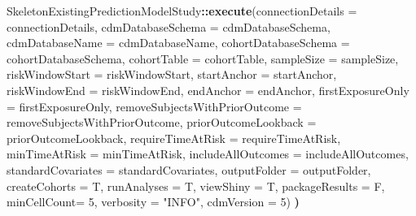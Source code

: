 \documentclass[
]{article}
\newenvironment{Shaded}{\begin{snugshade}}{\end{snugshade}}
\newcommand{\DataTypeTok}[1]{\textcolor[rgb]{0.13,0.29,0.53}{#1}}
\newcommand{\DecValTok}[1]{\textcolor[rgb]{0.00,0.00,0.81}{#1}}
\newcommand{\ErrorTok}[1]{\textcolor[rgb]{0.64,0.00,0.00}{\textbf{#1}}}
\newcommand{\KeywordTok}[1]{\textcolor[rgb]{0.13,0.29,0.53}{\textbf{#1}}}
\newcommand{\NormalTok}[1]{#1}
\newcommand{\OperatorTok}[1]{\textcolor[rgb]{0.81,0.36,0.00}{\textbf{#1}}}
\newcommand{\StringTok}[1]{\textcolor[rgb]{0.31,0.60,0.02}{#1}}
\begin{document}
\begin{Shaded}
\begin{Highlighting}[]
\NormalTok{  SkeletonExistingPredictionModelStudy}\OperatorTok{::}\KeywordTok{execute}\NormalTok{(}\DataTypeTok{connectionDetails =}\NormalTok{ connectionDetails,}
                                      \DataTypeTok{cdmDatabaseSchema =}\NormalTok{ cdmDatabaseSchema,}
                                      \DataTypeTok{cdmDatabaseName =}\NormalTok{ cdmDatabaseName,}
                                      \DataTypeTok{cohortDatabaseSchema =}\NormalTok{ cohortDatabaseSchema,}
                                      \DataTypeTok{cohortTable =}\NormalTok{ cohortTable,}
                                      \DataTypeTok{sampleSize =}\NormalTok{ sampleSize,}
                                      \DataTypeTok{riskWindowStart =}\NormalTok{ riskWindowStart,}
                                      \DataTypeTok{startAnchor =}\NormalTok{ startAnchor,}
                                      \DataTypeTok{riskWindowEnd =}\NormalTok{ riskWindowEnd,}
                                      \DataTypeTok{endAnchor =}\NormalTok{ endAnchor,}
                                      \DataTypeTok{firstExposureOnly =}\NormalTok{ firstExposureOnly,}
                                      \DataTypeTok{removeSubjectsWithPriorOutcome =}\NormalTok{ removeSubjectsWithPriorOutcome,}
                                      \DataTypeTok{priorOutcomeLookback =}\NormalTok{ priorOutcomeLookback,}
                                      \DataTypeTok{requireTimeAtRisk =}\NormalTok{ requireTimeAtRisk,}
                                      \DataTypeTok{minTimeAtRisk =}\NormalTok{ minTimeAtRisk,}
                                      \DataTypeTok{includeAllOutcomes =}\NormalTok{ includeAllOutcomes,}
                                      \DataTypeTok{standardCovariates =}\NormalTok{ standardCovariates,}
                                      \DataTypeTok{outputFolder =}\NormalTok{ outputFolder,}
                                      \DataTypeTok{createCohorts =}\NormalTok{ T,}
                                      \DataTypeTok{runAnalyses =}\NormalTok{ T,}
                                      \DataTypeTok{viewShiny =}\NormalTok{ T,}
                                      \DataTypeTok{packageResults =}\NormalTok{ F,}
                                      \DataTypeTok{minCellCount=} \DecValTok{5}\NormalTok{,}
                                      \DataTypeTok{verbosity =} \StringTok{"INFO"}\NormalTok{,}
                                      \DataTypeTok{cdmVersion =} \DecValTok{5}\NormalTok{)}
\ErrorTok{)}
\end{Highlighting}
\end{Shaded}
\end{document}
